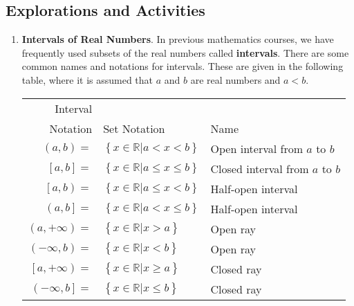 \subsection*{Explorations and Activities}
\setcounter{oldenumi}{\theenumi}
\begin{enumerate} \setcounter{enumi}{\theoldenumi}
  \item \textbf{Intervals of Real Numbers}. \label{A:intervals}  
In previous mathematics courses, we have frequently used subsets of the real numbers called \textbf{intervals}. 
%
  There are some common names and notations for intervals.  These are given in the following table, where it is assumed that  $a$  and  $b$  are real numbers  and  $a < b$. \label{exer:sec41-7}
\begin{center}
\begin{tabular}[h]{r l l}
Interval \\Notation     &     Set Notation     &     Name  \\ \hline
$\left( {a,b} \right) = $  &  $\left\{ {x \in \mathbb{R}\left.  \right|a < x < b} \right\}$  &  Open interval
\index{open interval}%
\index{interval!open}%
 from  $a$  to  $b$  \\
$\left[ {a,b} \right] = $  &	$\left\{ {x \in \mathbb{R}\left.  \right|a \leq x \leq b} \right\}$  &  	Closed interval
\index{closed interval}%
\index{interval!closed}%
 from  $a$  to  $b$  \\
$\left[ {a,b} \right) = $  &	$\left\{ {x \in \mathbb{R}\left.  \right|a \leq x < b} \right\}$  &  Half-open interval
\index{half-open interval}%
\index{interval!half-open}%
  \\
$\left( {a,b} \right] = $  &  $\left\{ {x \in \mathbb{R}\left.  \right|a < x \leq b} \right\}$  &  Half-open interval\\
$\left( {a, + \infty } \right) = $  &  $\left\{ {\left. {x \in \mathbb{R}} \right|x > a} \right\}$  &  Open ray  \\
$\left( { - \infty ,b} \right) = $  &  $\left\{ {\left. {x \in \mathbb{R}} \right|x < b} \right\}$  &  Open ray
\index{open ray}%
\index{ray!open}%
 \\
$\left[ {a, + \infty } \right) = $  &  $\left\{ {\left. {x \in \mathbb{R}} \right|x \geq a} \right\}$  &  Closed ray
\index{closed ray}%
\index{ray!closed}%
  \\
$\left( { - \infty ,b} \right] = $  &  $\left\{ {\left. {x \in \mathbb{R}} \right|x \leq b} \right\}$  &  Closed ray \\
\end{tabular}
\end{center}


\end{enumerate}
